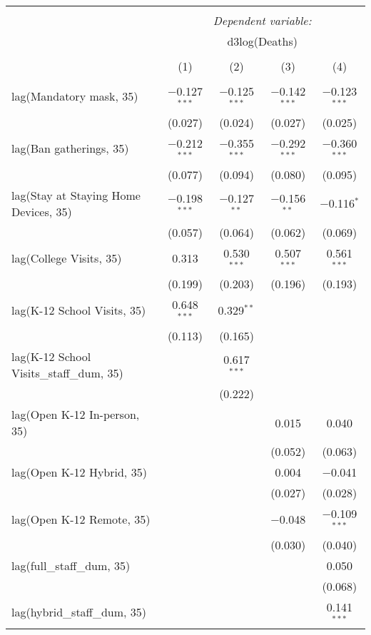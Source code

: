\begin{tabular}{@{\extracolsep{1pt}}lcccc} 
\\[-1.8ex]\hline 
\hline \\[-1.8ex] 
 & \multicolumn{4}{c}{\textit{Dependent variable:}} \\ 
\cline{2-5} 
 & \multicolumn{4}{c}{d3log(Deaths)} \\ 
\\[-1.8ex] & (1) & (2) & (3) & (4)\\ 
\hline \\[-1.8ex] 
 lag(Mandatory mask, 35) & $-$0.127$^{***}$ & $-$0.125$^{***}$ & $-$0.142$^{***}$ & $-$0.123$^{***}$ \\ 
  & (0.027) & (0.024) & (0.027) & (0.025) \\ 
  lag(Ban gatherings, 35) & $-$0.212$^{***}$ & $-$0.355$^{***}$ & $-$0.292$^{***}$ & $-$0.360$^{***}$ \\ 
  & (0.077) & (0.094) & (0.080) & (0.095) \\ 
  lag(Stay at Staying Home Devices, 35) & $-$0.198$^{***}$ & $-$0.127$^{**}$ & $-$0.156$^{**}$ & $-$0.116$^{*}$ \\ 
  & (0.057) & (0.064) & (0.062) & (0.069) \\ 
  lag(College Visits, 35) & 0.313 & 0.530$^{***}$ & 0.507$^{***}$ & 0.561$^{***}$ \\ 
  & (0.199) & (0.203) & (0.196) & (0.193) \\ 
  lag(K-12 School Visits, 35) & 0.648$^{***}$ & 0.329$^{**}$ &  &  \\ 
  & (0.113) & (0.165) &  &  \\ 
  lag(K-12 School Visits\_staff\_dum, 35) &  & 0.617$^{***}$ &  &  \\ 
  &  & (0.222) &  &  \\ 
  lag(Open K-12 In-person, 35) &  &  & 0.015 & 0.040 \\ 
  &  &  & (0.052) & (0.063) \\ 
  lag(Open K-12 Hybrid, 35) &  &  & 0.004 & $-$0.041 \\ 
  &  &  & (0.027) & (0.028) \\ 
  lag(Open K-12 Remote, 35) &  &  & $-$0.048 & $-$0.109$^{***}$ \\ 
  &  &  & (0.030) & (0.040) \\ 
  lag(full\_staff\_dum, 35) &  &  &  & 0.050 \\ 
  &  &  &  & (0.068) \\ 
  lag(hybrid\_staff\_dum, 35) &  &  &  & 0.141$^{***}$ \\ 

\end{tabular}
